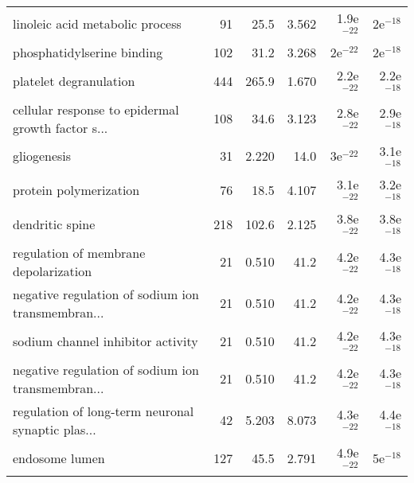\begin{longtable}{lrrrrr}
                   linoleic acid metabolic process &                      91 &                    25.5 &      3.562 &         1.9e$^{-22}$ &           2e$^{-18}$ \\
                        phosphatidylserine binding &                     102 &                    31.2 &      3.268 &           2e$^{-22}$ &           2e$^{-18}$ \\
                            platelet degranulation &                     444 &                   265.9 &      1.670 &         2.2e$^{-22}$ &         2.2e$^{-18}$ \\
 cellular response to epidermal growth factor s... &                     108 &                    34.6 &      3.123 &         2.8e$^{-22}$ &         2.9e$^{-18}$ \\
                                       gliogenesis &                      31 &                   2.220 &       14.0 &           3e$^{-22}$ &         3.1e$^{-18}$ \\
                            protein polymerization &                      76 &                    18.5 &      4.107 &         3.1e$^{-22}$ &         3.2e$^{-18}$ \\
                                   dendritic spine &                     218 &                   102.6 &      2.125 &         3.8e$^{-22}$ &         3.8e$^{-18}$ \\
             regulation of membrane depolarization &                      21 &                   0.510 &       41.2 &         4.2e$^{-22}$ &         4.3e$^{-18}$ \\
 negative regulation of sodium ion transmembran... &                      21 &                   0.510 &       41.2 &         4.2e$^{-22}$ &         4.3e$^{-18}$ \\
                 sodium channel inhibitor activity &                      21 &                   0.510 &       41.2 &         4.2e$^{-22}$ &         4.3e$^{-18}$ \\
 negative regulation of sodium ion transmembran... &                      21 &                   0.510 &       41.2 &         4.2e$^{-22}$ &         4.3e$^{-18}$ \\
 regulation of long-term neuronal synaptic plas... &                      42 &                   5.203 &      8.073 &         4.3e$^{-22}$ &         4.4e$^{-18}$ \\
                                    endosome lumen &                     127 &                    45.5 &      2.791 &         4.9e$^{-22}$ &           5e$^{-18}$ \\

\end{longtable}
